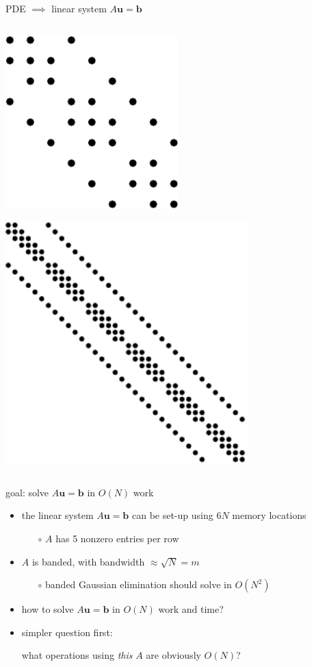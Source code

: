 \documentclass[10pt,
               svgnames,
               hyperref={colorlinks,citecolor=DeepPink4,linkcolor=FireBrick,urlcolor=Maroon},
               usepdftitle=false]{beamer}
\newcommand{\bb}{\mathbf{b}}
\newcommand{\bu}{\mathbf{u}}
\begin{document}
\begin{frame}{PDE $\implies$ linear system $A\bu=\bb$}
\begin{columns}
\begin{column}{0.27\textwidth}
\bigskip\medskip
\hfill \includegraphics[width=0.5\textwidth]{images/lapspy5.pdf}

\bigskip
\hfill \includegraphics[width=0.7\textwidth]{images/lapspy8.pdf}

\end{column}
\end{columns}
\end{frame}


\begin{frame}{goal: solve $A\bu=\bb$ in $O(N)$ work}
\begin{itemize}
\item the linear system $A\bu=\bb$ can be set-up using  $6N$ memory locations
	\begin{itemize}
	\item[$\circ$] $A$ has 5 nonzero entries per row
	\end{itemize}
\item $A$ is banded, with bandwidth $\approx \sqrt{N}=m$
	\begin{itemize}
	\item[$\circ$] banded Gaussian elimination should solve in $O(N^2)$
	\end{itemize}
\item how to solve $A\bu=\bb$ in $O(N)$ work and time?

\bigskip
\item<2> simpler question first:

\medskip
\qquad what operations using \emph{this} $A$ are obviously $O(N)$?
\end{itemize}
\end{frame}
\end{document}
